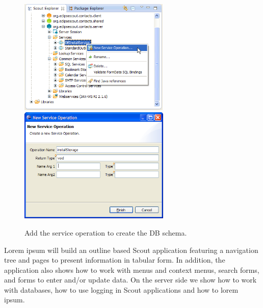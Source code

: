 \documentclass[a4paper,10pt,twoside]{book}
\begin{document}
\begin{figure}
\includegraphics[height=5.5cm]{new_operation_installstorage_contextmenu.png} \hspace{5mm}
\includegraphics[height=5.5cm]{new_operation_installstorage.png} 
\caption{Add the service operation to create the DB schema. }
\end{figure}

Lorem ipsum will build an outline based Scout application featuring a navigation tree and pages to present information in tabular form. 
In addition, the application also shows how to work with menus and context menus, search forms, and forms to enter and/or update data. 
On the server side we show how to work with databases, how to use logging in Scout applications and how to lorem ipsum. 
\end{document}
